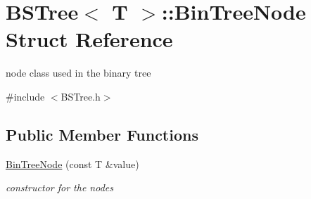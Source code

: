 \hypertarget{structBSTree_1_1BinTreeNode}{\section{B\-S\-Tree$<$ T $>$\-:\-:Bin\-Tree\-Node Struct Reference}
\label{structBSTree_1_1BinTreeNode}
}


node class used in the binary tree  




{\ttfamily \#include $<$B\-S\-Tree.\-h$>$}

\subsection*{Public Member Functions}
\begin{DoxyCompactItemize}
\item 
\hypertarget{structBSTree_1_1BinTreeNode_ae3214dd7d735bf71c9e05d8e55613390}{\hyperlink{structBSTree_1_1BinTreeNode_ae3214dd7d735bf71c9e05d8e55613390}{Bin\-Tree\-Node} (const T \&value)}\label{structBSTree_1_1BinTreeNode_ae3214dd7d735bf71c9e05d8e55613390}

\begin{DoxyCompactList}\small\item\em constructor for the nodes \end{DoxyCompactList}\end{DoxyCompactItemize}

